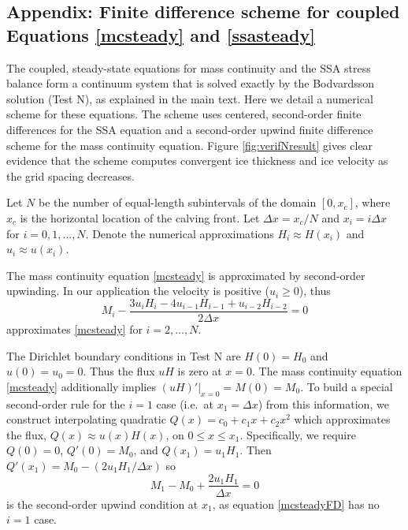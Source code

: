 \documentclass[twocolumn,letterpaper]{igs}
\begin{document}



\appendix

\subsection{Appendix: Finite difference scheme for coupled Equations \eqref{mcsteady} and \eqref{ssasteady}}  The coupled, steady-state equations for mass continuity and the SSA stress balance form a continuum system that is solved exactly by the Bodvardsson solution (Test N), as explained in the main text.  Here we detail a numerical scheme for these equations.  The scheme uses centered, second-order finite differences for the SSA equation and a second-order upwind finite difference scheme for the mass continuity equation.  Figure \ref{fig:verifNresult} gives clear evidence that the scheme computes convergent ice thickness and ice velocity as the grid spacing decreases.

Let $N$ be the number of equal-length subintervals of the domain $[0,x_c]$, where $x_c$ is the horizontal location of the calving front.  Let $\Delta x = x_c/N$ and $x_i = i \Delta x$ for $i=0,1,\dots,N$.  %
Denote the numerical approximations $H_i\approx H(x_i)$ and $u_i \approx u(x_i)$.

The mass continuity equation \eqref{mcsteady} is approximated by second-order upwinding.  In our application the velocity is positive ($u_i\ge 0$), thus
\begin{equation}
M_i - \frac{3 u_i H_i - 4 u_{i-1} H_{i-1} + u_{i-2} H_{i-2}}{2 \Delta x} = 0 \label{mcsteadyFD}
\end{equation}
approximates \eqref{mcsteady} for $i=2,\dots,N$.

The Dirichlet boundary conditions in Test N are $H(0)=H_0$ and $u(0)=u_0=0$.  Thus the flux $uH$ is zero at $x=0$.  The mass continuity equation \eqref{mcsteady} additionally implies $(uH)'\big|_{x=0}=M(0)=M_0$.  To build a special second-order rule for the $i=1$ case (i.e.~at $x_1 = \Delta x$) from this information, we construct interpolating quadratic $Q(x) = c_0 + c_1 x + c_2 x^2$ which approximates the flux, $Q(x) \approx u(x)H(x)$, on $0 \le x \le x_1$.  Specifically, we require $Q(0)=0$, $Q'(0)=M_0$, and $Q(x_1) = u_1 H_1$.  Then $Q'(x_1) = M_0 - (2 u_1 H_1/  \Delta x)$ so
\begin{equation}
M_1 - M_0 + \frac{2 u_1 H_1}{\Delta x} = 0 \label{mcbcFD}
\end{equation}
is the second-order upwind condition at $x_1$, as equation \eqref{mcsteadyFD} has no $i=1$ case.
\end{document}
